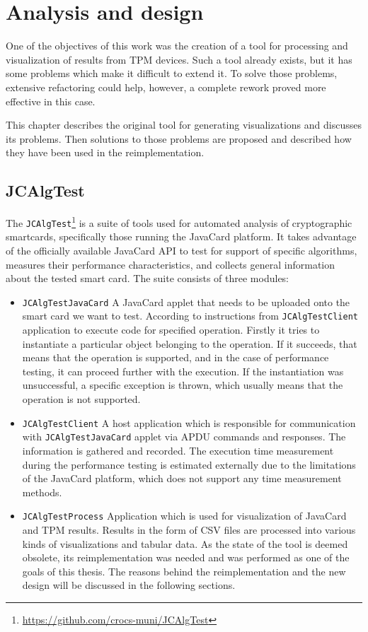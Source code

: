 \chapter{Analysis and design}
One of the objectives of this work was the creation of a tool for processing and visualization of results from TPM devices. Such a tool already exists, but it has some problems which make it difficult to extend it. To solve those problems, extensive refactoring could help, however, a complete rework proved more effective in this case.

This chapter describes the original tool for generating visualizations and discusses its problems. Then solutions to those problems are proposed and described how they have been used in the reimplementation.

\section{JCAlgTest}
The \texttt{JCAlgTest}\footnote{\url{https://github.com/crocs-muni/JCAlgTest}} is a suite of tools used for automated analysis of cryptographic smartcards, specifically those running the JavaCard platform. It takes advantage of the officially available JavaCard API to test for support of specific algorithms, measures their performance characteristics, and collects general information about the tested smart card. The suite consists of three modules:
\begin{itemize}
  \item
        \texttt{JCAlgTestJavaCard} A JavaCard applet that needs to be uploaded onto the smart card we want to test. According to instructions from \texttt{JCAlgTestClient} application to execute code for specified operation. Firstly it tries to instantiate a particular object belonging to the operation. If it succeeds, that means that the operation is supported, and in the case of performance testing, it can proceed further with the execution. If the instantiation was unsuccessful, a specific exception is thrown, which usually means that the operation is not supported.
  \item
        \texttt{JCAlgTestClient} A host application which is responsible for communication with \texttt{JCAlgTestJavaCard} applet via APDU commands and responses. The information is gathered and recorded. The execution time measurement during the performance testing  is estimated externally due to the limitations of the JavaCard platform, which does not support any time measurement methods.
  \item
        \texttt{JCAlgTestProcess} Application which is used for visualization of JavaCard and TPM results. Results in the form of CSV files are processed into various kinds of visualizations and tabular data. As the state of the tool is deemed obsolete, its reimplementation was needed and was performed as one of the goals of this thesis. The reasons behind the reimplementation and the new design will be discussed in the following sections.
\end{itemize}

